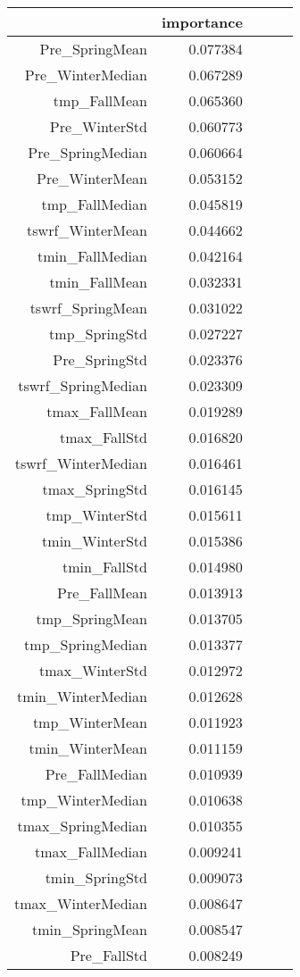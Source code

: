 \begin{tabular}{rrrrr}
\toprule
 & importance \\
\midrule
Pre_SpringMean & 0.077384 \\
Pre_WinterMedian & 0.067289 \\
tmp_FallMean & 0.065360 \\
Pre_WinterStd & 0.060773 \\
Pre_SpringMedian & 0.060664 \\
Pre_WinterMean & 0.053152 \\
tmp_FallMedian & 0.045819 \\
tswrf_WinterMean & 0.044662 \\
tmin_FallMedian & 0.042164 \\
tmin_FallMean & 0.032331 \\
tswrf_SpringMean & 0.031022 \\
tmp_SpringStd & 0.027227 \\
Pre_SpringStd & 0.023376 \\
tswrf_SpringMedian & 0.023309 \\
tmax_FallMean & 0.019289 \\
tmax_FallStd & 0.016820 \\
tswrf_WinterMedian & 0.016461 \\
tmax_SpringStd & 0.016145 \\
tmp_WinterStd & 0.015611 \\
tmin_WinterStd & 0.015386 \\
tmin_FallStd & 0.014980 \\
Pre_FallMean & 0.013913 \\
tmp_SpringMean & 0.013705 \\
tmp_SpringMedian & 0.013377 \\
tmax_WinterStd & 0.012972 \\
tmin_WinterMedian & 0.012628 \\
tmp_WinterMean & 0.011923 \\
tmin_WinterMean & 0.011159 \\
Pre_FallMedian & 0.010939 \\
tmp_WinterMedian & 0.010638 \\
tmax_SpringMedian & 0.010355 \\
tmax_FallMedian & 0.009241 \\
tmin_SpringStd & 0.009073 \\
tmax_WinterMedian & 0.008647 \\
tmin_SpringMean & 0.008547 \\
Pre_FallStd & 0.008249 \\

\end{tabular}
